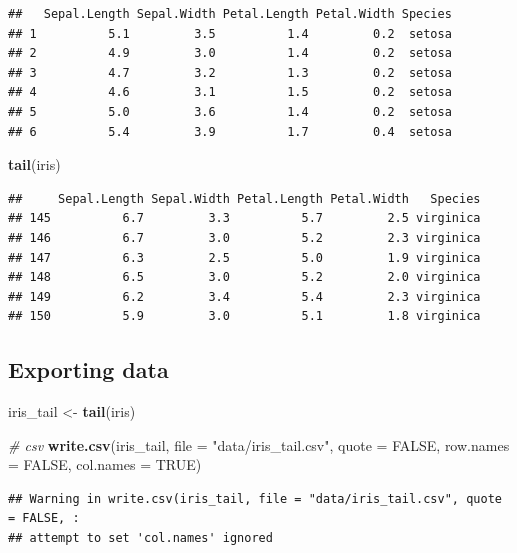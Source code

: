 \documentclass[
]{article}
\newenvironment{Shaded}{\begin{snugshade}}{\end{snugshade}}
\newcommand{\CommentTok}[1]{\textcolor[rgb]{0.56,0.35,0.01}{\textit{#1}}}
\newcommand{\DataTypeTok}[1]{\textcolor[rgb]{0.13,0.29,0.53}{#1}}
\newcommand{\KeywordTok}[1]{\textcolor[rgb]{0.13,0.29,0.53}{\textbf{#1}}}
\newcommand{\NormalTok}[1]{#1}
\newcommand{\OtherTok}[1]{\textcolor[rgb]{0.56,0.35,0.01}{#1}}
\newcommand{\StringTok}[1]{\textcolor[rgb]{0.31,0.60,0.02}{#1}}
\begin{document}
\begin{verbatim}
##   Sepal.Length Sepal.Width Petal.Length Petal.Width Species
## 1          5.1         3.5          1.4         0.2  setosa
## 2          4.9         3.0          1.4         0.2  setosa
## 3          4.7         3.2          1.3         0.2  setosa
## 4          4.6         3.1          1.5         0.2  setosa
## 5          5.0         3.6          1.4         0.2  setosa
## 6          5.4         3.9          1.7         0.4  setosa
\end{verbatim}

\begin{Shaded}
\begin{Highlighting}[]
\KeywordTok{tail}\NormalTok{(iris)}
\end{Highlighting}
\end{Shaded}

\begin{verbatim}
##     Sepal.Length Sepal.Width Petal.Length Petal.Width   Species
## 145          6.7         3.3          5.7         2.5 virginica
## 146          6.7         3.0          5.2         2.3 virginica
## 147          6.3         2.5          5.0         1.9 virginica
## 148          6.5         3.0          5.2         2.0 virginica
## 149          6.2         3.4          5.4         2.3 virginica
## 150          5.9         3.0          5.1         1.8 virginica
\end{verbatim}

\hypertarget{exporting-data}{%
\subsection{Exporting data}\label{exporting-data}}

\begin{Shaded}
\begin{Highlighting}[]
\NormalTok{iris_tail <-}\StringTok{ }\KeywordTok{tail}\NormalTok{(iris)}

\CommentTok{# csv}
\KeywordTok{write.csv}\NormalTok{(iris_tail, }\DataTypeTok{file =} \StringTok{"data/iris_tail.csv"}\NormalTok{, }\DataTypeTok{quote =} \OtherTok{FALSE}\NormalTok{, }\DataTypeTok{row.names =} \OtherTok{FALSE}\NormalTok{, }\DataTypeTok{col.names =} \OtherTok{TRUE}\NormalTok{)}
\end{Highlighting}
\end{Shaded}

\begin{verbatim}
## Warning in write.csv(iris_tail, file = "data/iris_tail.csv", quote = FALSE, :
## attempt to set 'col.names' ignored
\end{verbatim}
\end{document}

